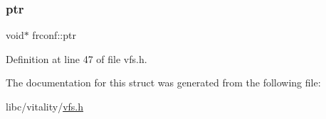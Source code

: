 \subsubsection{\texorpdfstring{ptr}{ptr}}
{\footnotesize\ttfamily void$\ast$ frconf\+::ptr}



Definition at line 47 of file vfs.\+h.



The documentation for this struct was generated from the following file\+:\begin{DoxyCompactItemize}
\item 
libc/vitality/\hyperlink{a00191}{vfs.\+h}\end{DoxyCompactItemize}
